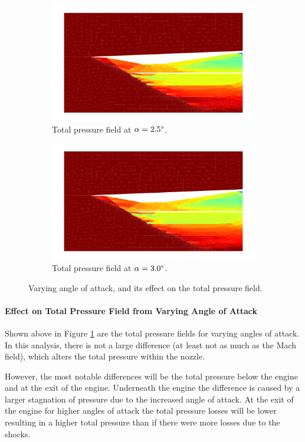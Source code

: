 \begin{figure}[h]
    \begin{subfigure}[h]{0.48\linewidth}
        \centering
        \includegraphics[width=\linewidth]{rep/q5/pt_a25.pdf}
        \caption{Total pressure field at $\alpha=2.5\degree$.}
    \end{subfigure}
    \begin{subfigure}[h]{0.48\linewidth}
        \centering
        \includegraphics[width=\linewidth]{rep/q5/pt_a30.pdf}
        \caption{Total pressure field at $\alpha=3.0\degree$.}
    \end{subfigure}
    \caption[Total Pressure Field with Varying Angle of Attack]{Varying angle of attack, and its effect on the total pressure field.}
    \label{fig:pt_fields}
\end{figure}

\paragraph{Effect on Total Pressure Field from Varying Angle of Attack} Shown above in Figure \ref{fig:pt_fields} are the total pressure fields for varying angles of attack. In this analysis, there is not a large difference (at least not as much as the Mach field), which alters the total pressure within the nozzle. 

However, the most notable differences will be the total pressure below the engine and at the exit of the engine. Underneath the engine the difference is caused by a larger stagnation of pressure due to the increased angle of attack. At the exit of the engine for higher angles of attack the total pressure losses will be lower resulting in a higher total pressure than if there were more losses due to the shocks.


